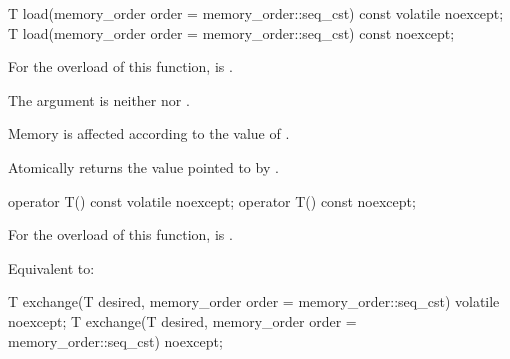 %
%
%
%
%
%
\begin{itemdecl}
T load(memory_order order = memory_order::seq_cst) const volatile noexcept;
T load(memory_order order = memory_order::seq_cst) const noexcept;
\end{itemdecl}

\begin{itemdescr}
\pnum
\constraints
For the  overload of this function,
 is .

\pnum
\expects
The  argument is neither  nor .

\pnum
\effects
Memory is affected according to the value of .

\pnum
\returns
Atomically returns the value pointed to by .
\end{itemdescr}

%
%
%
%
\begin{itemdecl}
operator T() const volatile noexcept;
operator T() const noexcept;
\end{itemdecl}

\begin{itemdescr}
\pnum
\constraints
For the  overload of this function,
 is .

\pnum
\effects
Equivalent to: 
\end{itemdescr}


%
%
%
%
%
%
\begin{itemdecl}
T exchange(T desired, memory_order order = memory_order::seq_cst) volatile noexcept;
T exchange(T desired, memory_order order = memory_order::seq_cst) noexcept;
\end{itemdecl}

